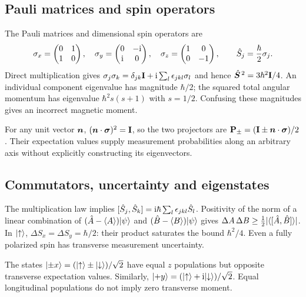\subsection{Pauli matrices and spin operators}
The Pauli matrices and dimensional spin operators are
\begin{equation}
 \sigma_x=\begin{pmatrix}0&1\\1&0\end{pmatrix},\quad
 \sigma_y=\begin{pmatrix}0&-\mathrm{i}\\\mathrm{i}&0\end{pmatrix},\quad
 \sigma_z=\begin{pmatrix}1&0\\0&-1\end{pmatrix},\qquad
 \hat{S}_j=\frac{\hbar}{2}\sigma_j .
 \label{eq:02:pauli}
\end{equation}
Direct multiplication gives
$\sigma_j\sigma_k=\delta_{jk}\mathbf{I}+
\mathrm{i}\sum_l\epsilon_{jkl}\sigma_l$ and hence
$\hat{\bm{S}}^{\,2}=3\hbar^2\mathbf{I}/4$.
An individual component eigenvalue has magnitude $\hbar/2$;
the squared total angular momentum has eigenvalue
$\hbar^2s(s+1)$ with $s=1/2$. Confusing these magnitudes gives an
incorrect magnetic moment.

For any unit vector $\bm{n}$,
$(\bm{n}\cdot\bm{\sigma})^2=\mathbf{I}$, so the two projectors are
$\mathbf{P}_\pm=(\mathbf{I}\pm\bm{n}\cdot\bm{\sigma})/2$.
Their expectation values supply measurement probabilities along an
arbitrary axis without explicitly constructing its eigenvectors.

\subsection{Commutators, uncertainty and eigenstates}
The multiplication law implies
$[\hat{S}_j,\hat{S}_k]=\mathrm{i}\hbar\sum_l\epsilon_{jkl}\hat{S}_l$.
Positivity of the norm of a linear combination of
$(\hat{A}-\langle A\rangle)\lvert \psi\rangle$ and
$(\hat{B}-\langle B\rangle)\lvert \psi\rangle$ gives
$\Delta A\,\Delta B\geq\tfrac12\lvert\langle[\hat{A},\hat{B}]\rangle\rvert$.
In $\lvert \uparrow\rangle$, $\Delta S_x=\Delta S_y=\hbar/2$:
their product saturates the bound $\hbar^2/4$.
Even a fully polarized spin has transverse measurement uncertainty.

The states $\lvert \pm x\rangle=(\lvert \uparrow\rangle\pm\lvert \downarrow\rangle)/\sqrt2$
have equal $z$ populations but opposite transverse expectation values.
Similarly, $\lvert +y\rangle=(\lvert \uparrow\rangle+\mathrm{i}\lvert \downarrow\rangle)/\sqrt2$.
Equal longitudinal populations do not imply zero transverse moment.

